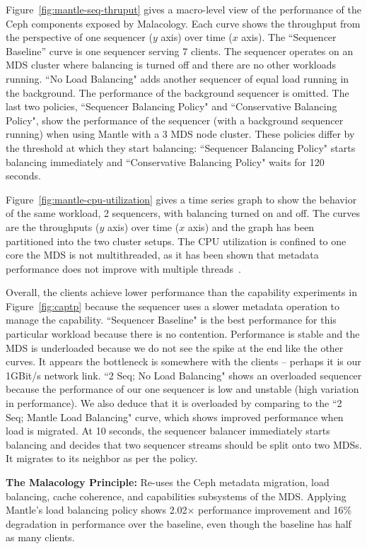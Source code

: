 \documentclass[10pt,twocolumn]{article}
\begin{document}
Figure~\ref{fig:mantle-seq-thruput} gives a macro-level view of the performance
of the Ceph components exposed by Malacology. Each curve shows the throughput
from the perspective of one sequencer (\(y\) axis) over time (\(x\) axis).  The
``Sequencer Baseline'' curve is one sequencer serving 7 clients.  The sequencer
operates on an MDS cluster where balancing is turned off and there are no other
workloads running. ``No Load Balancing" adds another sequencer of equal load
running in the background. The performance of the background sequencer is
omitted. The last two policies, ``Sequencer Balancing Policy" and
``Conservative Balancing Policy", show the performance of the sequencer (with a
background sequencer running) when using Mantle with a 3 MDS node cluster.
These policies differ by the threshold at which they start balancing:
``Sequencer Balancing Policy" starts balancing immediately and ``Conservative
Balancing Policy" waits for 120 seconds.

Figure~\ref{fig:mantle-cpu-utilization} gives a time series graph to show the
behavior of the same workload, 2 sequencers, with balancing turned on and off.
The curves are the throughputs (\(y\) axis) over time (\(x\) axis) and the graph
has been partitioned into the two cluster setups. The CPU utilization is
confined to one core the MDS is not multithreaded, as it has been shown that
metadata performance does not improve with multiple
threads~\cite{konstantinos:pdsw2014-lustre-metadata}. 

Overall, the clients achieve lower performance than the capability experiments
in Figure~\ref{fig:captp} because the sequencer uses a slower metadata
operation to manage the capability.  ``Sequencer Baseline" is the best
performance for this particular workload because there is no contention.
Performance is stable and the MDS is underloaded because we do not see the
spike at the end like the other curves. It appears the bottleneck is somewhere
with the clients -- perhaps it is our 1GBit/s network link. ``2 Seq; No Load
Balancing" shows an overloaded sequencer because the performance of our one
sequencer is low and unstable (high variation in performance). We also deduce
that it is overloaded by comparing to the ``2 Seq; Mantle Load Balancing"
curve, which shows improved performance when load is migrated. At 10 seconds,
the sequencer balancer immediately starts balancing and decides that two
sequencer streams should be split onto two MDSs. It migrates to its neighbor as
per the policy. 

\textbf{The Malacology Principle:} Re-uses the Ceph metadata migration, load
balancing, cache coherence, and capabilities subsystems of the MDS. Applying
Mantle's load balancing policy shows 2.02\(\times\) performance improvement and
16\% degradation in performance over the baseline, even though the baseline has
half as many clients.
\end{document}

